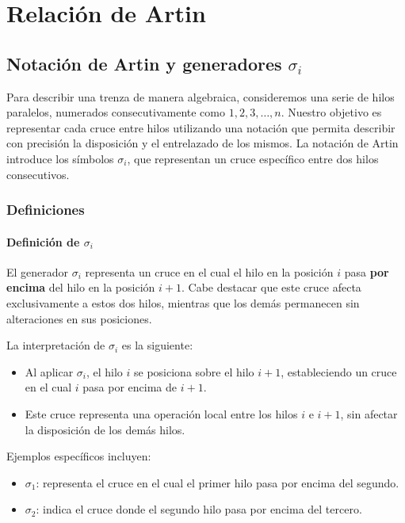 \chapter{Relación de Artin}
\label{ch::capitulo2}

\section{Notación de Artin y generadores \(\sigma_i\)}

Para describir una trenza de manera algebraica, consideremos una serie de hilos paralelos, numerados consecutivamente como \(1, 2, 3, \dots, n\). Nuestro objetivo es representar cada cruce entre hilos utilizando una notación que permita describir con precisión la disposición y el entrelazado de los mismos. La notación de Artin introduce los símbolos \(\sigma_i\), que representan un cruce específico entre dos hilos consecutivos.

\subsection{Definiciones}
\subsubsection*{Definición de \(\sigma_i\)}

El generador \(\sigma_i\) representa un cruce en el cual el hilo en la posición \(i\) pasa \textbf{por encima} del hilo en la posición \(i+1\). Cabe destacar que este cruce afecta exclusivamente a estos dos hilos, mientras que los demás permanecen sin alteraciones en sus posiciones.

La interpretación de \(\sigma_i\) es la siguiente:

\begin{itemize}
    \item Al aplicar \(\sigma_i\), el hilo \(i\) se posiciona sobre el hilo \(i+1\), estableciendo un cruce en el cual \(i\) pasa por encima de \(i+1\).
    \item Este cruce representa una operación local entre los hilos \(i\) e \(i+1\), sin afectar la disposición de los demás hilos.
\end{itemize}

Ejemplos específicos incluyen:
\begin{itemize}
    \item \(\sigma_1\): representa el cruce en el cual el primer hilo pasa por encima del segundo.
    \item \(\sigma_2\): indica el cruce donde el segundo hilo pasa por encima del tercero.
\end{itemize}

